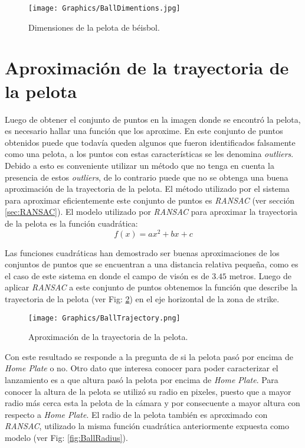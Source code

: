 \begin{figure}[!h]
    \centering
    \texttt{[image: Graphics/BallDimentions.jpg]}
    \caption{Dimensiones de la pelota de béisbol.}
    \label{fig:BallDimentions}
\end{figure}

\section{Aproximación de la trayectoria de la pelota}

Luego de obtener el conjunto de puntos en la imagen donde se encontró la pelota, es necesario hallar una función que los aproxime. En este conjunto de puntos obtenidos puede que todavía queden algunos que fueron identificados falsamente como una pelota, a los puntos con estas características se les denomina \textit{outliers}. Debido a esto es conveniente utilizar un método que no tenga en cuenta la presencia de estos \textit{outliers}, de lo contrario puede que no se obtenga una buena aproximación de la trayectoria de la pelota. El método utilizado por el sistema para aproximar eficientemente este conjunto de puntos es \textit{RANSAC} (ver sección \ref{sec:RANSAC}). El modelo utilizado por \textit{RANSAC} para aproximar la trayectoria de la pelota es la función cuadrática:
$$f(x) = ax^2+bx+c$$

Las funciones cuadráticas han demostrado ser buenas aproximaciones de los conjuntos de puntos que se encuentran a una distancia relativa pequeña, como es el caso de este sistema en donde el campo de visón es de $3.45$ metros. Luego de aplicar \textit{RANSAC} a este conjunto de puntos obtenemos la función que describe la trayectoria de la pelota (ver Fig: \ref{fig:BallTrajectory}) en el eje horizontal de la zona de strike.

\begin{figure}[!h]
    \centering
    \texttt{[image: Graphics/BallTrajectory.png]}
    \caption{Aproximación de la trayectoria de la pelota.}
    \label{fig:BallTrajectory}
\end{figure}

Con este resultado se responde a la pregunta de si la pelota pasó por encima de \textit{Home Plate} o no. Otro dato que interesa conocer para poder caracterizar el lanzamiento es a que altura pasó la pelota por encima de \textit{Home Plate}. Para conocer la altura de la pelota se utilizó su radio en pixeles, puesto que a mayor radio más cerca esta la pelota de la cámara y por consecuente a mayor altura con respecto a \textit{Home Plate}. El radio de la pelota también es aproximado con \textit{RANSAC}, utilizado la misma función cuadrática anteriormente expuesta como modelo (ver Fig: \ref{fig:BallRadius}).

